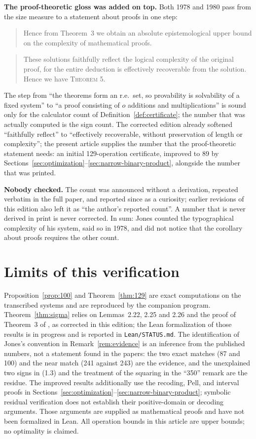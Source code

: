 \documentclass[11pt,letterpaper]{article}
\theoremstyle{definition}
\theoremstyle{remark}
\numberwithin{equation}{section}
\newcommand{\file}[1]{\texttt{#1}}
\begin{document}
\medskip\noindent\textbf{The proof-theoretic gloss was added on top.} Both
1978 and 1980 pass from the size measure to a statement about proofs in one
step:
\begin{quote}\small
Hence from Theorem~3 we obtain an absolute epistemological upper bound on
the complexity of mathematical proofs. \hfill\cite[p.~338]{J78}
\end{quote}
\begin{quote}\small
These solutions faithfully reflect the logical complexity of the original
proof, for the entire deduction is effectively recoverable from the
solution. Hence we have \textsc{Theorem 5}. \hfill\cite[p.~862]{J80}
\end{quote}
The step from ``the theorems form an r.e.\ set, so provability is
solvability of a fixed system'' to ``a proof consisting of $o$ additions and
multiplications'' is sound only for the calculator count of
Definition~\ref{def:certificate}; the number that was actually computed is
the sign count. The corrected edition already softened ``faithfully
reflect'' to ``effectively recoverable, without preservation of length or
complexity''; the present article supplies the number that the
proof-theoretic statement needs: an initial 129-operation certificate,
improved to 89 by Sections~\ref{sec:optimization}--\ref{sec:narrow-binary-product}, alongside the number
that was printed.

\medskip\noindent\textbf{Nobody checked.} The count was announced without a
derivation, repeated verbatim in the full paper, and reported since as a
curiosity; earlier revisions of this edition also left it as ``the
author's reported count''. A number that is never derived in print is never
corrected. In sum: Jones counted the typographical complexity of his system,
said so in 1978, and did not notice that the corollary about proofs requires
the other count.

\section{Limits of this verification}

Proposition~\ref{prop:100} and Theorem~\ref{thm:129} are exact computations
on the transcribed systems and are reproduced by the companion program.
Theorem~\ref{thm:sigma} relies on Lemmas~2.22, 2.25 and 2.26 and the proof of
Theorem~3 of \cite{J82}, as corrected in this edition; the Lean
formalization of those results is in progress and is reported in
\file{Lean/STATUS.md}. The identification of Jones's convention in
Remark~\ref{rem:evidence} is an inference from the published numbers, not a
statement found in the papers: the two exact matches (87 and 100) and the
near match (241 against 243) are the evidence, and the unexplained two signs
in (1.3) and the treatment of the squaring in the ``350'' remark are the
residue. The improved results additionally use the recoding, Pell, and
interval proofs in Sections~\ref{sec:optimization}--\ref{sec:narrow-binary-product};
symbolic residual verification does not establish their positive-domain
or decoding arguments. Those
arguments are supplied as mathematical proofs and have not been
formalized in Lean. All operation bounds in this article are upper bounds;
no optimality is claimed.
\end{document}
